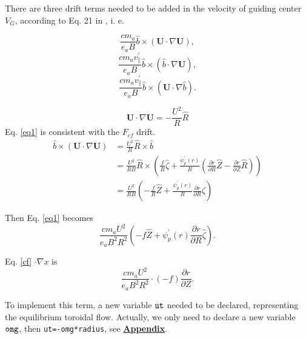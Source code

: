 \documentclass[12pt]{article}
\begin{document}
\begin{CJK*}{UTF8}{gbsn}
There are three drift terms needed to be added in the velocity of guiding center $V_{G}$, 
according to Eq. 21 in \cite{sugama98}, i. e.  

\begin{equation}
    \frac{cm_a}{e_aB}\hat{b} \times (\mathbf{U} \cdot \nabla \mathbf{U}), \label{eq1}
\end{equation}
\begin{equation}
    \frac{cm_av_{\parallel}^{'}}{e_aB} \hat{b} \times (\hat{b} \cdot \nabla \mathbf{U}), \label{eq2}
\end{equation}
\begin{equation}
    \frac{cm_av_{\parallel}^{'}}{e_aB} \hat{b} \times (\mathbf{U} \cdot\nabla\hat{b}). \label{eq3}
\end{equation}


\begin{equation}
    \mathbf{U} \cdot \nabla \mathbf{U} = - \frac{U^2}{R} \hat{R}
\end{equation}
Eq. \ref{eq1} is consistent with the $F_{cf}$ drift.
\begin{equation}
    \begin{split}
        \hat{b} \times (\mathbf{U} \cdot \nabla \mathbf{U}) &= \frac{U^2}{R} \hat{R} \times \hat{b}\\
        &= \frac{U^2}{RB} \hat{R} \times (\frac{f}{R}\hat{\zeta} + \frac{\psi_{p}^{'}(r)}{R}(\frac{\partial r}{\partial R}\hat{Z} - \frac{\partial r}{\partial Z}\hat{R}))\\
        &= \frac{U^2}{RB} (-\frac{f}{R}\hat{Z} + \frac{\psi_{p}^{'}(r)}{R} \frac{\partial r}{\partial R}\hat{\zeta}) \label{eq5}
    \end{split}
\end{equation}

Then Eq. \ref{eq1} becomes  
\begin{equation}
    \frac{cm_aU^2}{e_aB^2R^2}(-f\hat{Z} + \psi_{p}^{'}(r)\frac{\partial r}{\partial R} \hat{\zeta}).\label{cf}
\end{equation}

Eq. \ref{cf} $\cdot \nabla x$ is
\begin{equation}
    \frac{cm_aU^2}{e_aB^2R^2} \cdot (-f) \frac{\partial r}{\partial Z}.
\end{equation}

To implement this term, a new variable ${\tt ut}$ needed to be declared, representing the equilibrium toroidal flow. 
Actually, we only need to declare a new variable ${\tt omg}$, then \texttt{ut=-omg*radius}, see \hyperref[app]{\bf Appendix}.


\end{CJK*}
\end{document}
